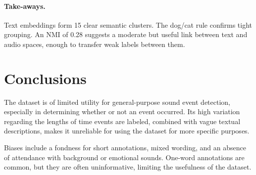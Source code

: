 \documentclass[runningheads]{llncs}
\begin{document}
\paragraph{Take‑aways.} Text embeddings form 15 clear semantic clusters. The dog/cat rule confirms tight grouping. An NMI of 0.28 suggests a moderate but useful link between text and audio spaces, enough to transfer weak labels between them.


\section{Conclusions} 
 The dataset is of limited utility for general-purpose sound event detection, especially in determining whether or not an event occurred. Its high variation regarding the lengths of time events are labeled, combined with vague textual descriptions, makes it unreliable for using the dataset for more specific purposes.

Biases include a fondness for short annotations, mixed wording, and an absence of attendance with background or emotional sounds. One-word annotations are common, but they are often uninformative, limiting the usefulness of the dataset.
\end{document}
